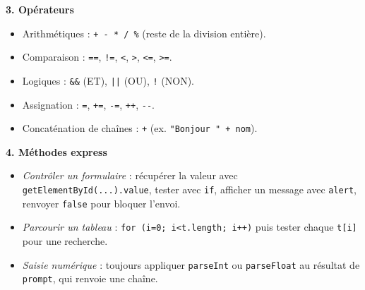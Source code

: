 \documentclass[11pt]{article}
\begin{document}
\begin{bilan}
\textbf{3. Opérateurs}
\begin{itemize}
  \item Arithmétiques : \texttt{+ - * / \%} (reste de la division entière).
  \item Comparaison : \texttt{==}, \texttt{!=}, \texttt{<}, \texttt{>}, \texttt{<=}, \texttt{>=}.
  \item Logiques : \texttt{\&\&} (ET), \texttt{||} (OU), \texttt{!} (NON).
  \item Assignation : \texttt{=}, \texttt{+=}, \texttt{-=}, \texttt{++}, \texttt{-{}-}.
  \item Concaténation de chaînes : \texttt{+} (ex. \texttt{"Bonjour " + nom}).
\end{itemize}

\textbf{4. Méthodes express}
\begin{itemize}
  \item \emph{Contrôler un formulaire} : récupérer la valeur avec \texttt{getElementById(...).value}, tester avec \texttt{if}, afficher un message avec \texttt{alert}, renvoyer \texttt{false} pour bloquer l'envoi.
  \item \emph{Parcourir un tableau} : \texttt{for (i=0; i<t.length; i++)} puis tester chaque \texttt{t[i]} pour une recherche.
  \item \emph{Saisie numérique} : toujours appliquer \texttt{parseInt} ou \texttt{parseFloat} au résultat de \texttt{prompt}, qui renvoie une chaîne.
\end{itemize}
\end{bilan}
\end{document}
